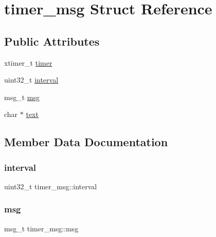 \hypertarget{structtimer__msg}{}\section{timer\+\_\+msg Struct Reference}
\label{structtimer__msg}
\subsection*{Public Attributes}
\begin{DoxyCompactItemize}
\item 
xtimer\+\_\+t \hyperlink{structtimer__msg_ade2adc6d3a23d119680f640ac9d98898}{timer}
\item 
uint32\+\_\+t \hyperlink{structtimer__msg_ae7d81cafa068f3bd178c2f8f81c36876}{interval}
\item 
msg\+\_\+t \hyperlink{structtimer__msg_ab1447283c656e8073c728179c1062b44}{msg}
\item 
char $\ast$ \hyperlink{structtimer__msg_ad700f90a5b3763c830866711ce4bb294}{text}
\end{DoxyCompactItemize}


\subsection{Member Data Documentation}
\mbox{\label{structtimer__msg_ae7d81cafa068f3bd178c2f8f81c36876}} 
\subsubsection{\texorpdfstring{interval}{interval}}
{\footnotesize\ttfamily uint32\+\_\+t timer\+\_\+msg\+::interval}

\mbox{\label{structtimer__msg_ab1447283c656e8073c728179c1062b44}} 
\subsubsection{\texorpdfstring{msg}{msg}}
{\footnotesize\ttfamily msg\+\_\+t timer\+\_\+msg\+::msg}

\mbox{\label{structtimer__msg_ad700f90a5b3763c830866711ce4bb294}} 
